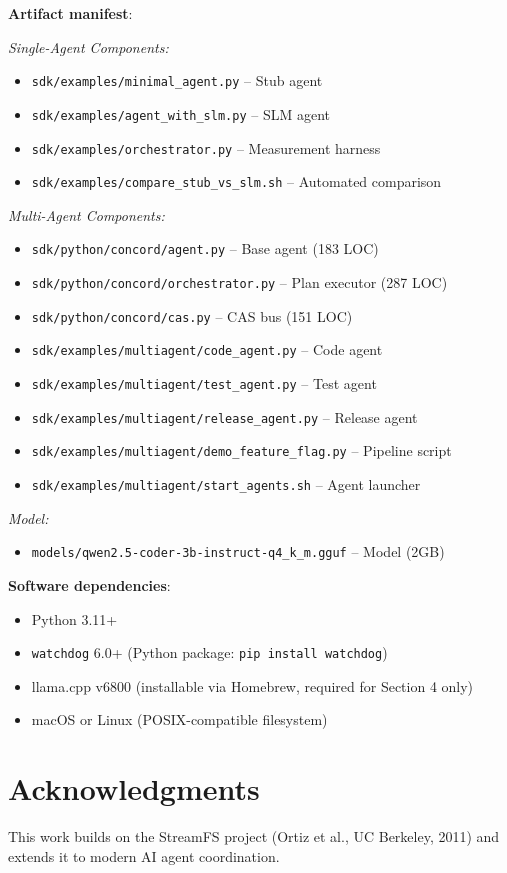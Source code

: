 \documentclass[11pt]{article}
\begin{document}
\textbf{Artifact manifest}:

\emph{Single-Agent Components:}
\begin{itemize}
\item \texttt{sdk/examples/minimal\_agent.py} -- Stub agent
\item \texttt{sdk/examples/agent\_with\_slm.py} -- SLM agent
\item \texttt{sdk/examples/orchestrator.py} -- Measurement harness
\item \texttt{sdk/examples/compare\_stub\_vs\_slm.sh} -- Automated comparison
\end{itemize}

\emph{Multi-Agent Components:}
\begin{itemize}
\item \texttt{sdk/python/concord/agent.py} -- Base agent (183 LOC)
\item \texttt{sdk/python/concord/orchestrator.py} -- Plan executor (287 LOC)
\item \texttt{sdk/python/concord/cas.py} -- CAS bus (151 LOC)
\item \texttt{sdk/examples/multiagent/code\_agent.py} -- Code agent
\item \texttt{sdk/examples/multiagent/test\_agent.py} -- Test agent
\item \texttt{sdk/examples/multiagent/release\_agent.py} -- Release agent
\item \texttt{sdk/examples/multiagent/demo\_feature\_flag.py} -- Pipeline script
\item \texttt{sdk/examples/multiagent/start\_agents.sh} -- Agent launcher
\end{itemize}

\emph{Model:}
\begin{itemize}
\item \texttt{models/qwen2.5-coder-3b-instruct-q4\_k\_m.gguf} -- Model (2GB)
\end{itemize}

\textbf{Software dependencies}:
\begin{itemize}
\item Python 3.11+
\item \texttt{watchdog} 6.0+ (Python package: \texttt{pip install watchdog})
\item llama.cpp v6800 (installable via Homebrew, required for Section 4 only)
\item macOS or Linux (POSIX-compatible filesystem)
\end{itemize}

\section*{Acknowledgments}

This work builds on the StreamFS project (Ortiz et al., UC Berkeley, 2011) and extends it to modern AI agent coordination.


\end{document}
